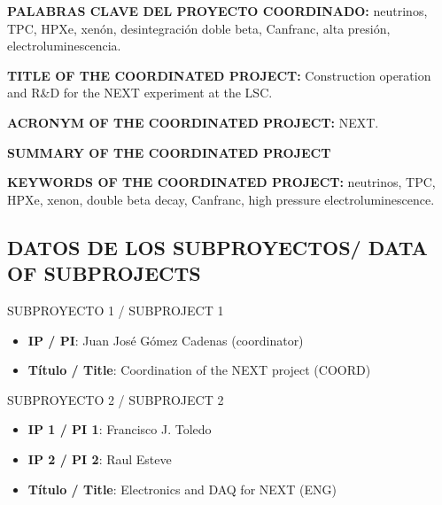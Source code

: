 \documentclass[a4paper,11pt,oneside]{article}
\begin{document}
 \vspace{0.3cm}

{\sc \bf PALABRAS CLAVE DEL PROYECTO COORDINADO:} neutrinos, TPC, HPXe, xenón, desintegración doble beta, Canfranc, alta presión, electroluminescencia. 

 \vspace{0.6cm}
{\sc \bf TITLE OF THE COORDINATED PROJECT:} Construction operation and R\&D for the NEXT experiment at the LSC. 
\vspace{0.3cm}

{\sc \bf ACRONYM OF THE COORDINATED PROJECT:} NEXT.
\vspace{0.3cm}

{\bf \bf SUMMARY OF THE COORDINATED PROJECT} 
\vspace{0.3cm}



 \vspace{0.3cm}

{\bf KEYWORDS OF THE COORDINATED PROJECT:} neutrinos, TPC, HPXe, xenon, double beta decay, Canfranc, high pressure electroluminescence. 

\newpage


\subsection{DATOS DE LOS SUBPROYECTOS/ DATA OF SUBPROJECTS }

{\sc SUBPROYECTO 1 / SUBPROJECT 1}

\begin{itemize}
\item {\bf IP / PI}: Juan José Gómez Cadenas (coordinator)
\item {\bf Título / Title}: Coordination of the NEXT project (COORD)
\end{itemize}

{\sc SUBPROYECTO 2 / SUBPROJECT 2}

\begin{itemize}
\item {\bf IP 1 / PI 1}: Francisco J. Toledo 
\item {\bf IP 2 / PI 2}: Raul Esteve
\item {\bf Título / Title}: Electronics and DAQ for NEXT (ENG)
\end{itemize}
\end{document}
